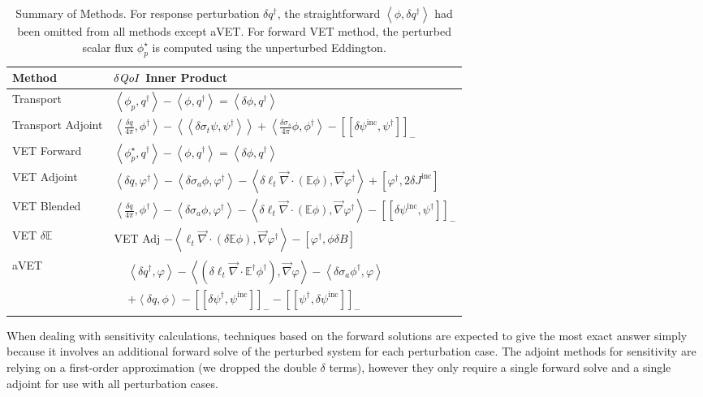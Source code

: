 \documentclass[12pt]{report}
\newcommand{\bra}{\left\langle}
\newcommand{\ket}{\right\rangle}
\newcommand{\braSN}{\left\langle \! \left\langle}
\newcommand{\ketSN}{\right\rangle \! \right\rangle}
\newcommand{\sbraSN}{\left[ \! \left[}
\newcommand{\sketSN}{\right] \! \right]}
\newcommand{\sbra}{\left[}
\newcommand{\sket}{\right]}
\renewcommand{\div}{\vec{\nabla} \cdot}
\newcommand{\grad}{\vec{\nabla}}
\newcommand{\vefadj}{\varphi^\dag}
\newcommand{\Edd}{\mathbb{E}}
\newcommand{\BEdd}{B}
\newcommand{\sigt}{\sigma_t}
\newcommand{\sigs}{\sigma_s}
\newcommand{\siga}{\sigma_a}
\newcommand{\isigt}{\ell_t}
\newcommand{\angSourced}{\frac{\delta q}{4 \pi}}
\newcommand{\scalSource}{q}
\newcommand{\scalResp}{q^\dag}
\newcommand{\qoi}{{\it QoI}\xspace}
\begin{document}
\begin{table}[H]
\centering
  \begin{tabular}{| l | l |}
    \hline
    Method  &  $\delta \qoi$ Inner Product \\ \hline
     Transport 			&$\bra \phi_{p} , \scalResp \ket - \bra \phi , \scalResp \ket = \bra \delta \phi , \scalResp \ket $ \\ \hline
     Transport Adjoint  			&$\bra \angSourced, \phi^\dag \ket - \braSN \delta\sigt\psi , \psi^\dag \ketSN + \bra \frac{\delta \sigs}{4 \pi} \phi
 , \phi^\dag \ket - \sbraSN \delta \psi^{\text{inc}}, \psi^\dag \sketSN_-$\\ \hline
  VET Forward 			&$\bra \phi_{p}^\star , \scalResp \ket - \bra \phi , \scalResp \ket = \bra \delta \phi , \scalResp \ket $ \\ \hline
     VET Adjoint			&$ \bra \delta \scalSource, \vefadj  \ket - \bra \delta \siga \phi, \vefadj \ket  - \bra \delta \isigt \div \left( \Edd \phi \right) , \grad \vefadj \ket + \sbra \vefadj, 2 \delta J^{\text{inc}} \sket$\\ \hline
     VET Blended			&$\bra \angSourced , \phi^\dag \ket - \bra \delta \siga \phi, \vefadj \ket - \bra \delta \isigt \div \left( \Edd \phi \right) , \grad \vefadj \ket 
- \sbraSN \delta \psi^\text{inc}, \psi^\dag \sketSN_- $\\ \hline
     VET $\delta \Edd$ 	&VET Adj $- \bra  \isigt \div \left( \delta \Edd \phi \right), \grad \vefadj \ket
- \sbra \vefadj, \phi \delta \BEdd \sket$ \\ \hline
     aVET			&$
     \begin{array}{lcl}
     &\bra \delta q^\dag, \varphi \ket - \bra\left( \delta \isigt \div \Edd^\dag \phi^\dag  \right), \grad \varphi \ket 
- \bra \delta \siga \phi^\dag , \varphi \ket \\ 
&+ \bra \delta q , \phi \ket  - \sbraSN \delta \psi^\dag,  \psi^{\text{inc}} \sketSN_- - \sbraSN \psi^\dag,  \delta \psi^{\text{inc}} \sketSN_- 
\end{array}$ \\ \hline
    \end{tabular}
  \caption{Summary of Methods. For response perturbation $\delta q^\dag$, the straightforward $\bra \phi , \delta q^\dag \ket $ had been omitted from all methods except aVET. For forward VET method, the perturbed scalar flux $\phi_{p}^\star$ is computed using the unperturbed Eddington.}
  \label{IPTable}
\end{table}

When dealing with sensitivity calculations, techniques based on the forward solutions are expected to give the most exact answer simply because it involves an additional forward solve of the perturbed system for each perturbation case. The adjoint methods for sensitivity are relying on a first-order approximation (we dropped the double $\delta$ terms), however they only require a single forward solve and a single adjoint for use with all perturbation cases. 
\end{document}
